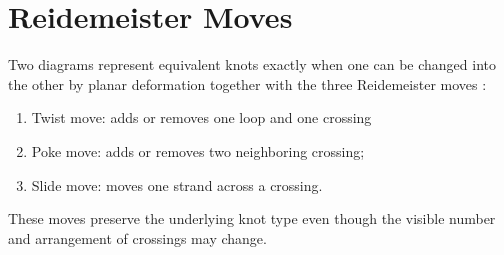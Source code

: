 \section{ Reidemeister Moves}

Two diagrams represent equivalent knots exactly when
one can be changed into the other by planar deformation
together with the three Reidemeister moves \cite{kauffman1987}:

\begin{enumerate}[label=\Roman*)]
    \item Twist move: adds or removes one loop and one crossing
    \item Poke move: adds or removes two neighboring crossing;
    \item Slide move: moves one strand across a crossing.
\end{enumerate}
These moves preserve the underlying knot type even
though the visible number and arrangement of crossings
may change.

